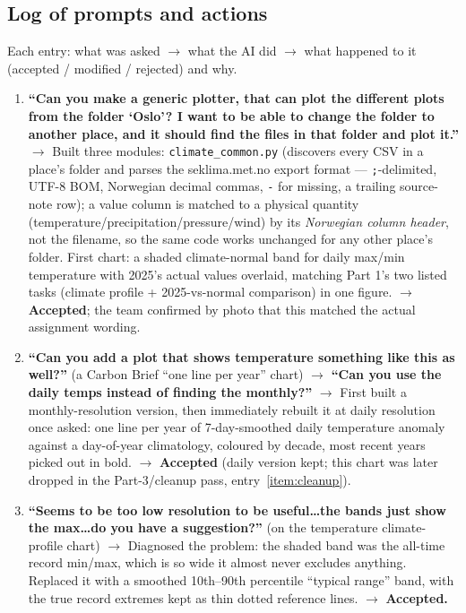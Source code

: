 \subsection*{Log of prompts and actions}

Each entry: what was asked $\rightarrow$ what the AI did $\rightarrow$ what happened to it
(accepted / modified / rejected) and why.

\begin{enumerate}[leftmargin=*, itemsep=0.8em]

\item \textbf{``Can you make a generic plotter, that can plot the different plots from the
folder `Oslo'? I want to be able to change the folder to another place, and it should find
the files in that folder and plot it.''}
$\rightarrow$ Built three modules: \texttt{climate\_common.py} (discovers every CSV in a
place's folder and parses the seklima.met.no export format --- \texttt{;}-delimited, UTF-8
BOM, Norwegian decimal commas, \texttt{-} for missing, a trailing source-note row); a value
column is matched to a physical quantity (temperature/precipitation/pressure/wind) by its
\emph{Norwegian column header}, not the filename, so the same code works unchanged for any
other place's folder. First chart: a shaded climate-normal band for daily max/min temperature
with 2025's actual values overlaid, matching Part 1's two listed tasks (climate profile +
2025-vs-normal comparison) in one figure.
$\rightarrow$ \textbf{Accepted}; the team confirmed by photo that this matched the actual
assignment wording.

\item \textbf{``Can you add a plot that shows temperature something like this as well?''}
(a Carbon Brief ``one line per year'' chart) $\rightarrow$ \textbf{``Can you use the daily
temps instead of finding the monthly?''}
$\rightarrow$ First built a monthly-resolution version, then immediately rebuilt it at daily
resolution once asked: one line per year of 7-day-smoothed daily temperature anomaly against
a day-of-year climatology, coloured by decade, most recent years picked out in bold.
$\rightarrow$ \textbf{Accepted} (daily version kept; this chart was later dropped in the
Part-3/cleanup pass, entry~\ref{item:cleanup}).

\item \textbf{``Seems to be too low resolution to be useful\ldots the bands just show the
max\ldots do you have a suggestion?''} (on the temperature climate-profile chart)
$\rightarrow$ Diagnosed the problem: the shaded band was the all-time record min/max, which
is so wide it almost never excludes anything. Replaced it with a smoothed 10th--90th
percentile ``typical range'' band, with the true record extremes kept as thin dotted
reference lines.
$\rightarrow$ \textbf{Accepted.}


\end{enumerate}
